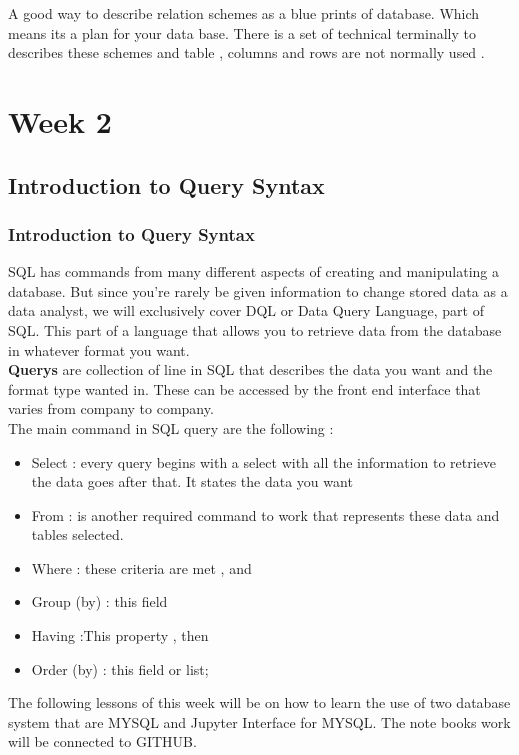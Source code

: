 \documentclass{article}
\begin{document}
A good way to describe relation schemes as a blue prints of database. Which means its a plan for your data base. There is a set of technical terminally to describes these schemes and table , columns and rows are not normally used .
\pagebreak

\section*{Week 2}
\subsection*{Introduction to Query Syntax}
\subsubsection*{Introduction to Query Syntax}
SQL has commands from many different aspects of creating and manipulating a database. But since you're rarely be given information to change stored data as a data analyst, we will exclusively cover DQL or Data Query Language, part of SQL. This part of a language that allows you to retrieve data from the database in whatever format you want.\\

\noindent  \textbf{Querys} are collection of line in SQL that describes the data you want and the format type wanted in. These can be accessed by the front end interface that varies from company to company.  \\

The main command in SQL query are the following :
\begin{itemize}
\item Select : every query begins with a select with all the information to retrieve the data goes after that. It states the data you want
\item From : is another required command to work that represents these data and tables selected.
\item Where : these criteria are met , and
\item Group (by) : this field
\item Having :This property , then
\item Order (by) : this field or list;
\end{itemize}

\noindent The following lessons of this week will be on how to learn the use of two database system that are MYSQL and Jupyter Interface for MYSQL. The note books work will be connected to GITHUB.\\
\end{document}
